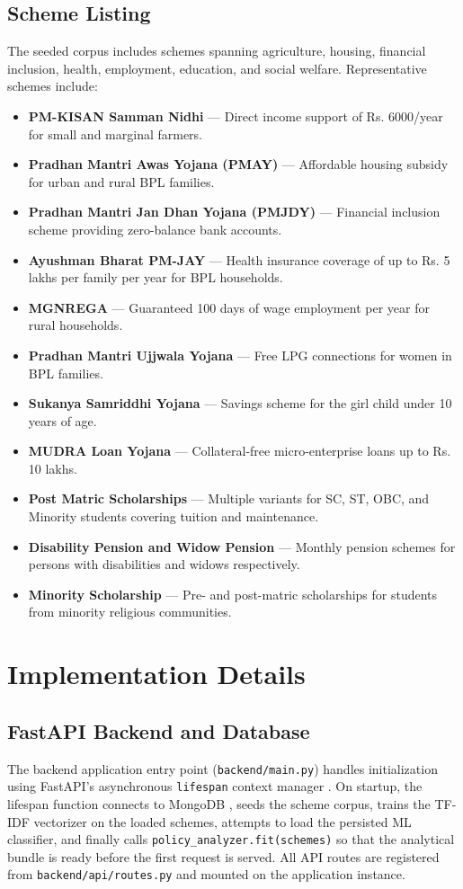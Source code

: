 \documentclass[10pt, journal, twocolumn]{IEEEtran}
\begin{document}
\subsection{Scheme Listing}
The seeded corpus includes schemes spanning agriculture, housing, financial inclusion, health, employment, education, and social welfare. Representative schemes include:
\begin{itemize}
    \item \textbf{PM-KISAN Samman Nidhi} --- Direct income support of Rs. 6000/year for small and marginal farmers.
    \item \textbf{Pradhan Mantri Awas Yojana (PMAY)} --- Affordable housing subsidy for urban and rural BPL families.
    \item \textbf{Pradhan Mantri Jan Dhan Yojana (PMJDY)} --- Financial inclusion scheme providing zero-balance bank accounts.
    \item \textbf{Ayushman Bharat PM-JAY} --- Health insurance coverage of up to Rs. 5 lakhs per family per year for BPL households.
    \item \textbf{MGNREGA} --- Guaranteed 100 days of wage employment per year for rural households.
    \item \textbf{Pradhan Mantri Ujjwala Yojana} --- Free LPG connections for women in BPL families.
    \item \textbf{Sukanya Samriddhi Yojana} --- Savings scheme for the girl child under 10 years of age.
    \item \textbf{MUDRA Loan Yojana} --- Collateral-free micro-enterprise loans up to Rs. 10 lakhs.
    \item \textbf{Post Matric Scholarships} --- Multiple variants for SC, ST, OBC, and Minority students covering tuition and maintenance.
    \item \textbf{Disability Pension and Widow Pension} --- Monthly pension schemes for persons with disabilities and widows respectively.
    \item \textbf{Minority Scholarship} --- Pre- and post-matric scholarships for students from minority religious communities.
\end{itemize}

\section{Implementation Details}

\subsection{FastAPI Backend and Database}
The backend application entry point (\texttt{backend/main.py}) handles initialization using FastAPI's asynchronous \texttt{lifespan} context manager \cite{fastapi}. On startup, the lifespan function connects to MongoDB \cite{mongodb}, seeds the scheme corpus, trains the TF-IDF vectorizer on the loaded schemes, attempts to load the persisted ML classifier, and finally calls \texttt{policy\_analyzer.fit(schemes)} so that the analytical bundle is ready before the first request is served. All API routes are registered from \texttt{backend/api/routes.py} and mounted on the application instance.
\end{document}
